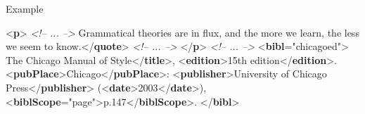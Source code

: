 \begin{reflist}
    \item[{Example}]
  \leavevmode\bgroup{}\exampleFont \begin{shaded}\noindent\mbox{}{<\textbf{p}>}\mbox{}\newline 
\textit{<!-- ... -->}\mbox{}\newline 
{}Grammatical theories are in flux, and the more we learn, the\mbox{}\newline 
\hspace*{1em}\hspace*{1em} less we seem to know.{</\textbf{quote}>}\mbox{}\newline 
\textit{<!-- ... -->}\mbox{}\newline 
{</\textbf{p}>}\mbox{}\newline 
\textit{<!-- ... -->}\mbox{}\newline 
{<\textbf{bibl}\hspace*{1em}{xml:id}="{chicago\textunderscore ed}">}\mbox{}\newline 
{}The Chicago Manual of Style{</\textbf{title}>},\mbox{}\newline 
{<\textbf{edition}>}15th edition{</\textbf{edition}>}. {<\textbf{pubPlace}>}Chicago{</\textbf{pubPlace}>}: {<\textbf{publisher}>}University of\mbox{}\newline 
\hspace*{1em}\hspace*{1em} Chicago Press{</\textbf{publisher}>} ({<\textbf{date}>}2003{</\textbf{date}>}), {<\textbf{biblScope}\hspace*{1em}{unit}="{page}">}p.147{</\textbf{biblScope}>}.\mbox{}\newline 
\mbox{}\newline 
{</\textbf{bibl}>}\end{shaded}\egroup 



\end{reflist}
